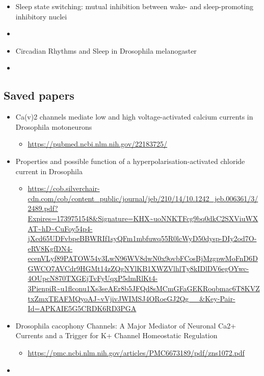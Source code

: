 \documentclass[../workflow.tex]{subfiles}
\begin{document}
\begin{itemize}
    \item Sleep state switching: mutual inhibition between wake- and sleep-promoting
    inhibitory nuclei \item \parencite{liuTwoDopaminergicNeurons2012,saperSleepStateSwitching2010}
    
    \item Circadian Rhythms and Sleep in Drosophila melanogaster \item \parencite{dubowyCircadianRhythmsSleep2017}

\end{itemize}


\subsection{Saved papers}

\begin{itemize}
    \item Ca(v)2 channels mediate low and high voltage-activated calcium currents in Drosophila motoneurons
    \begin{itemize}
        \item \url{https://pubmed.ncbi.nlm.nih.gov/22183725/}
    \end{itemize}

    \item Properties and possible function of a hyperpolarisation-activated chloride current
    in Drosophila
    \begin{itemize}
        \item \url{https://cob.silverchair-cdn.com/cob/content_public/journal/jeb/210/14/10.1242_jeb.006361/3/2489.pdf?Expires=1739751548&Signature=KHX~uoNNKTFcg9bq0dkC2SXViuWXAT~hD~CuFoy54p4-jXcd65UDFvbpeBBWRIf1syQFm1mbfuwq55R0lcWyD50dysp-DIy2od7O-eRV8KgfDN4-ecenVLyf89PATOW54v3LwN96WV8dwN0x9ovbFCosBjMzgpwMoFnD6DGWCO7AVCdr9HGMt14zZQgNYlKB1XWZVlhlTy8kIDlDV6egOYwc-4OUpcN870TXGEjTvFyUqxP5dmRlKt4-3PienpiR~u1flconu1Xs3seAEr8b5JFQd8sMCmGFaGEKRoqbmac6T8KVZtxZmxTEAFMQyoAJ~vVjivJWIMSJ4ORoeGJ2Qg__&Key-Pair-Id=APKAIE5G5CRDK6RD3PGA}
    \end{itemize}

    \item Drosophila cacophony Channels: A Major Mediator of
    Neuronal Ca2+ Currents and a Trigger for K+ Channel
    Homeostatic Regulation
    \begin{itemize}
        \item \url{https://pmc.ncbi.nlm.nih.gov/articles/PMC6673189/pdf/zns1072.pdf}
    \end{itemize}

    \item

    
\end{itemize}
\end{document}
